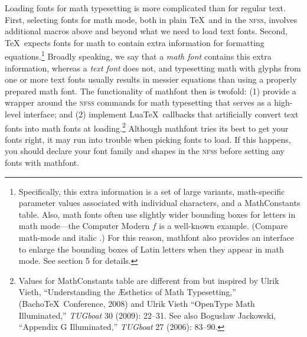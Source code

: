 \documentclass[12pt,twoside]{article}
\begin{document}
Loading fonts for math typesetting is more complicated than for regular text. First, selecting fonts for math mode, both in plain \TeX\ and in the \textsc{nfss}, involves additional macros above and beyond what we need to load text fonts. Second, \TeX\ expects fonts for math to contain extra information for formatting equations.\footnote{Specifically, this extra information is a set of large variants, math-specific parameter values associated with individual characters, and a MathConstants table. Also, math fonts often use slightly wider bounding boxes for letters in math mode---the Computer Modern $f$ is a well-known example. (Compare math-mode {\fboxsep=0pt} and italic {\fboxsep=0pt}.) For this reason, \textsf{mathfont} also provides an interface to enlarge the bounding boxes of Latin letters when they appear in math mode. See section 5 for details.} Broadly speaking, we say that a \textit{math font} contains this extra information, whereas a \textit{text font} does not, and typesetting math with glyphs from one or more text fonts usually results in messier equations than using a properly prepared math font. The functionality of \textsf{mathfont} then is twofold: (1) provide a wrapper around the \textsc{nfss} commands for math typesetting that serves as a high-level interface; and (2) implement Lua\TeX\ callbacks that artificially convert text fonts into math fonts at loading.\footnote{Values for MathConstants table are different from but inspired by Ulrik Vieth, ``Understanding the \AE sthetics of Math Typesetting,'' (Bacho\TeX\ Conference, 2008) and Ulrik Vieth ``OpenType Math Illuminated,'' \textit{TUGboat} 30 (2009): 22--31. See also Bogus\l aw Jackowski, ``Appendix G Illuminated,'' \textit{TUGboat} 27 (2006): 83--90.} Although \textsf{mathfont} tries its best to get your fonts right, it may run into trouble when picking fonts to load. If this happens, you should declare your font family and shapes in the \textsc{nfss} before setting any fonts with \textsf{mathfont}.
\end{document}
